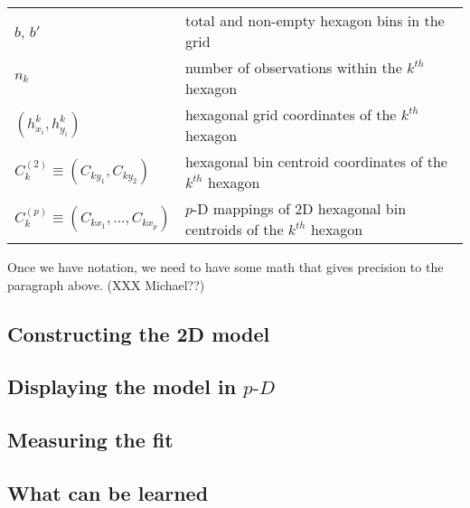 \documentclass[
  12pt]{article}
\newcommand\pD{$p\text{-}D$\ }
\begin{document}
\begin{table}[H]
\begin{tabular}[t]{>{\raggedright\arraybackslash}p{5cm}>{\raggedright\arraybackslash}p{12cm}}
$b$, $b'$ & total and non-empty hexagon bins in the grid\\
$n_k$ & number of observations within the $k^{th}$ hexagon\\
$(h^k_{x_i}, h^k_{y_i})$ & hexagonal grid coordinates of the $k^{th}$ hexagon\\
\addlinespace
$C_k^{(2)} \equiv (C_{ky_1}, C_{ky_2})$ & hexagonal bin centroid coordinates of the $k^{th}$ hexagon\\
$C_k^{(p)} \equiv (C_{kx_1}, ..., C_{kx_p})$ & $p$-D mappings of 2D hexagonal bin centroids of the $k^{th}$ hexagon\\
\bottomrule
\end{tabular}
\end{table}

Once we have notation, we need to have some math that gives precision to
the paragraph above. (XXX Michael??)

\subsection{Constructing the 2D model}\label{constructing-the-2d-model}

\subsection{\texorpdfstring{Displaying the model in
\pD}{Displaying the model in }}\label{displaying-the-model-in}

\subsection{Measuring the fit}\label{measuring-the-fit}

\subsection{What can be learned}\label{what-can-be-learned}
\end{document}

